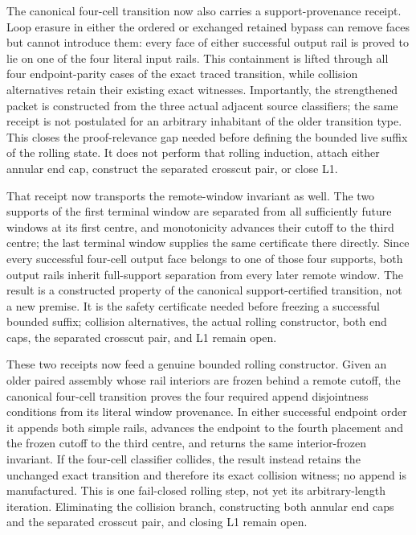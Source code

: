 \documentclass[11pt]{article}
\theoremstyle{definition}
\begin{document}
The canonical four-cell transition now also carries a support-provenance
receipt.  Loop erasure in either the ordered or exchanged retained bypass can
remove faces but cannot introduce them: every face of either successful output
rail is proved to lie on one of the four literal input rails.  This containment
is lifted through all four endpoint-parity cases of the exact traced
transition, while collision alternatives retain their existing exact
witnesses.  Importantly, the strengthened packet is constructed from the
three actual adjacent source classifiers; the same receipt is not postulated
for an arbitrary inhabitant of the older transition type.  This closes the
proof-relevance gap needed before defining the bounded live suffix of the
rolling state.  It does not perform that rolling induction, attach either
annular end cap, construct the separated crosscut pair, or close L1.

That receipt now transports the remote-window invariant as well.  The two
supports of the first terminal window are separated from all sufficiently
future windows at its first centre, and monotonicity advances their cutoff to
the third centre; the last terminal window supplies the same certificate there
directly.  Since every successful four-cell output face belongs to one of
those four supports, both output rails inherit full-support separation from
every later remote window.  The result is a constructed property of the
canonical support-certified transition, not a new premise.  It is the safety
certificate needed before freezing a successful bounded suffix; collision
alternatives, the actual rolling constructor, both end caps, the separated
crosscut pair, and L1 remain open.

These two receipts now feed a genuine bounded rolling constructor.  Given an
older paired assembly whose rail interiors are frozen behind a remote cutoff,
the canonical four-cell transition proves the four required append
disjointness conditions from its literal window provenance.  In either
successful endpoint order it appends both simple rails, advances the endpoint
to the fourth placement and the frozen cutoff to the third centre, and returns
the same interior-frozen invariant.  If the four-cell classifier collides, the
result instead retains the unchanged exact transition and therefore its exact
collision witness; no append is manufactured.  This is one fail-closed rolling
step, not yet its arbitrary-length iteration.  Eliminating the collision
branch, constructing both annular end caps and the separated crosscut pair,
and closing L1 remain open.
\end{document}

